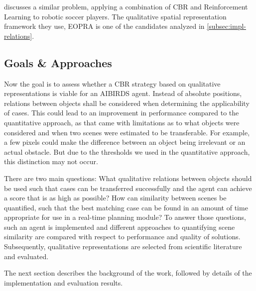 \cite{QCBR} discusses a similar problem, applying a combination of \ac{CBR} and Reinforcement Learning to robotic soccer players.
The qualitative spatial representation framework they use, \ac{EOPRA} is one of the candidates analyzed in \ref{subsec:impl-relations}.

\subsection{Goals \& Approaches}
Now the goal is to assess whether a \ac{CBR} strategy based on qualitative representations is viable for an AIBIRDS agent.
Instead of absolute positions, relations between objects shall be considered when determining the applicability of cases.
This could lead to an improvement in performance compared to the quantitative approach, as that came with limitations as to what objects were considered and when two scenes were estimated to be transferable. For example, a few pixels could make the difference between an object being irrelevant or an actual obstacle.
But due to the thresholds we used in the quantitative approach, this distinction may not occur.

There are two main questions: What qualitative relations between objects should be used such that cases can be transferred successfully and the agent can achieve a score that is as high as possible?
How can similarity between scenes be quantified, such that the best matching case can be found in an amount of time appropriate for use in a real-time planning module?
To answer those questions, such an agent is implemented and different approaches to quantifying scene similarity are compared with respect to performance and quality of solutions. Subsequently, qualitative representations are selected from scientific literature and evaluated.


The next section describes the background of the work, followed by details of the implementation and evaluation results.
